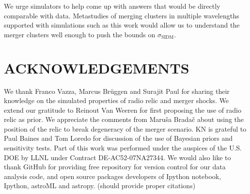 We urge simulators to help come up with answers that would be directly
comparable with data. Metastudies of merging clusters in multiple
wavelengths supported with simulations such as this work would allow us to
understand the merger clusters well enough to push the bounds on
$\sigma_{\text{SIDM}}$. \par 
\section{ACKNOWLEDGEMENTS}
We thank Franco Vazza, Marcus Br\"{u}ggen and Surajit Paul for sharing
their knowledge on the simulated properties of radio relic and merger
shocks. We extend our gratitude to Reinout Van Weeren for first proposing the use of
radio relic as prior. We appreciate the comments from Maru\v{s}a
Brada\v{c} about using the position of the relic to break degeneracy
of the merger scenario. KN is grateful to Paul Baines and Tom Loredo for
discussion of the use of Bayesian priors and sensitivity tests. 
Part of this work was performed under the auspices of the U.S. DOE by LLNL
under Contract DE-AC52-07NA27344. We would also like to thank 
GitHub for providing free repository for version control for our data
analysis code, and open source
packages developers of Ipython notebook, Ipython, astroML  and astropy.
(should provide proper citations)


\appendix
